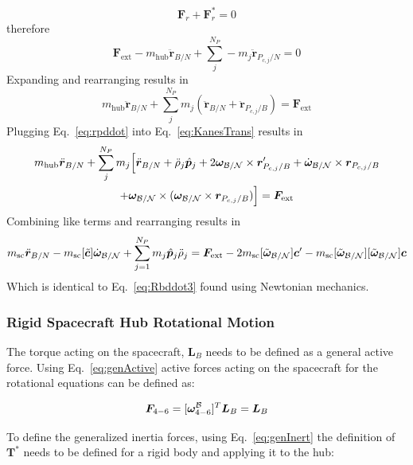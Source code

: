 \begin{equation}
	\bm F_r + \bm F^*_r = 0
	\label{eq:KanesEq}
\end{equation}
therefore
\begin{equation}
	\bm F_{\text{ext}} -m_{\text{hub}} \ddot{\bm r}_{B/N} + \sum\limits_{j}^{N_P} -m_j \ddot{\bm r}_{P_{c,j}/N} = 0
\end{equation}
Expanding and rearranging results in
\begin{equation}
	m_{\text{hub}} \ddot{\bm r}_{B/N} + \sum\limits_{j}^{N_P} m_j (\ddot{\bm r}_{B/N} + \ddot{\bm r}_{P_{c,j}/B}) = \bm F_{\text{ext}}
	\label{eq:KanesTrans}
\end{equation}
Plugging Eq.~\eqref{eq:rpddot} into Eq.~\eqref{eq:KanesTrans} results in
\begin{multline}
	m_{\text{hub}} \ddot{\bm r}_{B/N} + \sum\limits_{j}^{N_P} m_j \Big[\ddot{\bm r}_{B/N} + \ddot{\rho}_j \hat{\bm p}_j  +2 \bm\omega_{\cal B/N} \times \bm{r}'_{P_{c,j}/B} + \dot{\bm\omega}_{\cal B/N} \times \bm{r}_{P_{c,j}/B}  \\
	+\bm\omega_{\cal B/N} \times (\bm\omega_{\cal B/N} \times \bm{r}_{P_{c,j}/B})\Big] = \bm F_{\text{ext}}
\end{multline}
Combining like terms and rearranging results in
\begin{equation}
	m_{\text{sc}} \ddot{\bm r}_{B/N}-m_{\text{sc}} [\tilde{\bm{c}}] \dot{\bm\omega}_{\cal B/N} +\sum_{j=1}^{N_{P}}m_j \hat{\bm p}_j \ddot{\rho}_j = \bm F_{\text{ext}}	- 2 m_{\text{sc}} [\tilde{\bm\omega}_{\cal B/N}] \bm c'
	- m_{\text{sc}} [\tilde{\bm\omega}_{\cal B/N}][\tilde{\bm\omega}_{\cal B/N}]\bm{c}
	\label{eq:Rbddot4}
\end{equation}
Which is identical to Eq.~\eqref{eq:Rbddot3} found using Newtonian mechanics.
\subsubsection{Rigid Spacecraft Hub Rotational Motion}

The torque acting on the spacecraft, $\bm L_B$ needs to be defined as a general active force. Using Eq.~\eqref{eq:genActive} active forces acting on the spacecraft for the rotational equations can be defined as:

\begin{equation}
	\bm F_{4-6} = [\bm \omega_{4-6}^{\cal{B}}]^T \bm L_B = \bm L_B
\end{equation}

To define the generalized inertia forces, using Eq.~\eqref{eq:genInert} the definition of $\bm T^*$ needs to be defined for a rigid body and applying it to the hub:

